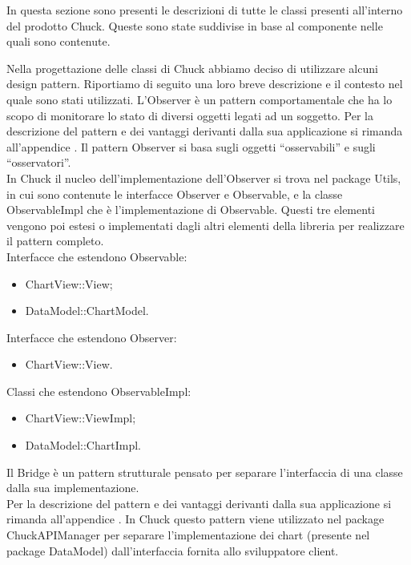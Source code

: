 		
		
		
		
		In questa sezione sono presenti le descrizioni di tutte le classi presenti all'interno del prodotto Chuck. Queste sono state suddivise in base al componente nelle quali sono contenute.
		
Nella progettazione delle classi di Chuck abbiamo deciso di utilizzare alcuni design pattern. Riportiamo di seguito una loro breve descrizione e il contesto nel quale sono stati utilizzati.
	L'Observer è un pattern comportamentale che ha lo scopo di monitorare lo stato di diversi oggetti legati ad un soggetto.
	Per la descrizione del pattern e dei vantaggi derivanti dalla sua applicazione si rimanda all'appendice .
	Il pattern Observer si basa sugli oggetti “osservabili” e sugli “osservatori”. \\In Chuck il nucleo dell'implementazione dell'Observer si trova nel package Utils, in cui sono contenute le interfacce Observer e Observable, e la classe ObservableImpl che è l'implementazione di Observable. Questi tre elementi vengono poi estesi o implementati dagli altri elementi della libreria per realizzare il pattern completo.\\
	Interfacce che estendono Observable:
	\begin{itemize}
	\item ChartView::View;
	\item DataModel::ChartModel.
	\end{itemize}
	Interfacce che estendono Observer:
	\begin{itemize}
	\item ChartView::View.
	\end{itemize}
	Classi che estendono ObservableImpl:
	\begin{itemize}
	\item ChartView::ViewImpl;
	\item DataModel::ChartImpl.
	\end{itemize}
	Il Bridge è un pattern strutturale pensato per separare l'interfaccia di una classe dalla sua implementazione.\\ Per la descrizione del pattern e dei vantaggi derivanti dalla sua applicazione si rimanda all'appendice .
	In Chuck questo pattern viene utilizzato nel package ChuckAPIManager per separare l'implementazione dei chart (presente nel package DataModel) dall'interfaccia fornita allo sviluppatore client.
